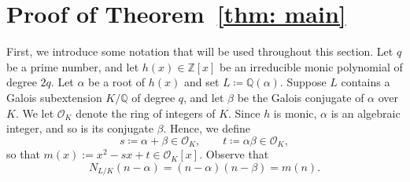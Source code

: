 \documentclass[11pt]{amsart}
\numberwithin{equation}{section}
\theoremstyle{definition}
\newcommand{\ZZ}{\mathbb{Z}}
\newcommand{\QQ}{\mathbb{Q}}
\newcommand{\cO}{\mathcal{O}}
\begin{document}
\section{Proof of Theorem~\ref{thm: main}}

First, we introduce some notation that will be used throughout this section. Let $q$ be a prime number, and let $h(x)\in\ZZ[x]$ be an irreducible monic polynomial of degree $2q$. Let $\alpha$ be a root of $h(x)$ and set $L \coloneqq \QQ(\alpha)$. Suppose $L$ contains a Galois subextension $K/\QQ$ of degree $q$, and let $\beta$ be the Galois conjugate of $\alpha$ over $K$. We let $\cO_K$ denote the ring of integers of $K$. Since \(h\) is monic, \(\alpha\) is an algebraic integer, and so is its conjugate \(\beta\). Hence, we define
\[
    s \coloneqq \alpha  + \beta \in\mathcal{O}_K,\qquad t \coloneqq \alpha\beta\in\cO_K,
\]
so that \(m(x) := x^2 - sx + t \in\cO_K[x]\). Observe that
\[
    N_{L/K}(n - \alpha)=(n - \alpha)(n  - \beta) = m(n).
\]
\end{document}

